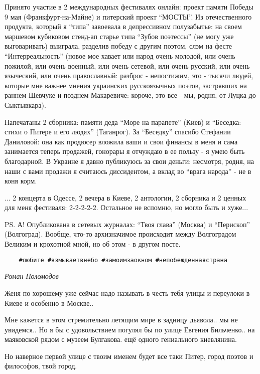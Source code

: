 Принято участие в 2 международных фестивалях онлайн: проект памяти Победы 9 мая
(Франкфурт-на-Майне) и питерский проект \enquote{МОСТЫ}. Из отечественного продукта,
который я \enquote{типа} завоевала в депрессивном полузабытье: на своем маршевом
кубиковом стенд-ап старье типа \enquote{Зубов поэтессы} (не могу уже выговаривать)
выиграла, разделив победу с другим поэтом, слэм на фесте \enquote{Интерреальность}
(новое мое хавает или народ очень молодой, или очень пожилой, или очень
военный, или очень сетевой, или очень русский, или очень языческий, или очень
православный: разброс - непостижим, это - тысячи людей, которые мне важнее
мнения украинских русскоязычных поэтов, застрявших на раннем Шевчуке и позднем
Макаревиче: короче, это все - мы, родня, от Луцка до Сыктывкара).

Напечатаны 2 сборника: памяти деда \enquote{Море на парапете} (Киев) и \enquote{Беседка: стихи
о Питере и его людях} (Таганрог). За \enquote{Беседку} спасибо Стефании Даниловой: она
как продюсер вложила ваши и свои финансы в меня и сама занимается теперь
продажей, гонорары я отчуждаю в ее пользу - я умею быть благодарной. В Украине
я давно публикуюсь за свои деньги: несмотря, родня, на наши с вами продажи я
считаюсь диссидентом, а вклад во \enquote{врага народа} - не в коня корм.

... 2 концерта в Одессе, 2 вечера в Киеве, 2 антологии, 2 сборника и 2 ценных
для меня фестиваля: 2-2-2-2-2. Остальное не вспомню, но могло быть и хуже...

PS. А! Опубликована в сетевых журналах: \enquote{Твоя глава} (Москва) и
\enquote{Перископ} (Волгоград). Вообще, что-то архизначимое происходит между
Волгоградом Великим и крохотной мной, но об этом - в другом посте. 

\begin{verbatim}
	#любите #взмываетвнебо #замоимзаокном #непобежденнаястрана
\end{verbatim}

\emph{Роман Поломодов}

Женя по хорошему уже сейчас надо называть в честь тебя улицы и переулоки в
Киеве и особенно в Москве..

Мне кажется в этом стремительно летящим мире в задницу дьявола.. мы не
увидемся.. Но я бы с удовольствием погулял бы по улице Евгения Бильченко.. на
маяковской рядом с музеем Булгакова. ещё одного гениального киевлянина.

Но наверное первой улице с твоим именем будет все таки Питер, город поэтов и
философов, твой город.

